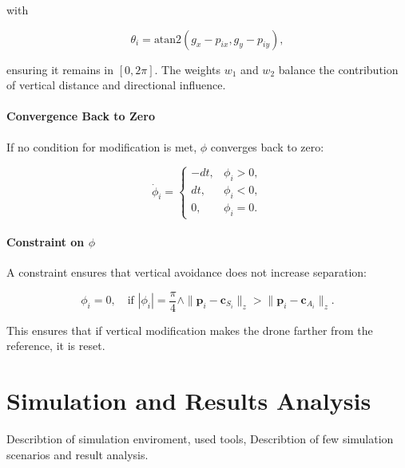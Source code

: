         with 
        
        \begin{equation}
            \theta_i = \text{atan2}(g_x - p_{ix}, g_y - p_{iy}),
        \end{equation}
        
        ensuring it remains in \([0, 2\pi]\). The weights \(w_1\) and \(w_2\) balance the contribution of vertical distance and directional influence.
        
        \paragraph{Convergence Back to Zero}  
        If no condition for modification is met, \(\phi\) converges back to zero:
        
        \begin{equation}
            \dot{\phi}_i = 
            \begin{cases}
                -dt, & \phi_i > 0, \\
                dt, & \phi_i < 0, \\
                0, & \phi_i = 0.
            \end{cases}
        \end{equation}
        
        \paragraph{Constraint on \(\phi\)}  
        A constraint ensures that vertical avoidance does not increase separation:
        
        \begin{equation}
            \phi_i = 0, \quad \text{if } |\phi_i| = \frac{\pi}{4} \land \|\mathbf{p}_i - \mathbf{c}_{S_i}\|_z > \|\mathbf{p}_i - \mathbf{c}_{A_i}\|_z.
        \end{equation}
        
        This ensures that if vertical modification makes the drone farther from the reference, it is reset.

\section{Simulation and Results Analysis}

Describtion of simulation enviroment, used tools, Describtion of few simulation scenarios and result analysis.
